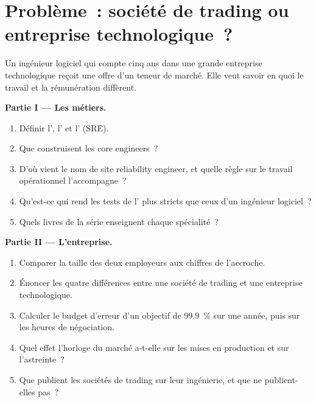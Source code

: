\section{Problème~: société de trading ou entreprise technologique~?}

\begin{problem}\label{pb:in:software-engineer:1}
Un ingénieur logiciel qui compte cinq ans dans une grande entreprise technologique reçoit une offre d'un teneur de marché. Elle veut savoir en quoi
le travail et la rémunération diffèrent.

\medskip\noindent\textbf{Partie I --- Les métiers.}
\begin{enumerate}
\item Définir l', l' et l' (SRE).
\item Que construisent les core engineers~?
\item D'où vient le nom de site reliability engineer, et quelle règle sur le travail opérationnel l'accompagne~?
\item Qu'est-ce qui rend les tests de l' plus stricts que ceux d'un ingénieur logiciel~?
\item Quels livres de la série enseignent chaque spécialité~?
\end{enumerate}

\medskip\noindent\textbf{Partie II --- L'entreprise.}
\begin{enumerate}[resume]
\item Comparer la taille des deux employeurs aux chiffres de l'accroche.
\item Énoncer les quatre différences entre une société de trading et une entreprise technologique.
\item Calculer le budget d'erreur d'un objectif de 99.9~\% sur une année, puis sur les heures de négociation.
\item Quel effet l'horloge du marché a-t-elle sur les mises en production et sur l'astreinte~?
\item Que publient les sociétés de trading sur leur ingénierie, et que ne publient-elles pas~?
\end{enumerate}


\end{problem}
